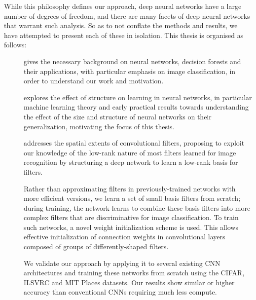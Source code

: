 \documentclass[thesis]{subfiles}
\begin{document}
While this philosophy defines our approach, deep neural networks have a large number of degrees of freedom, and there are many facets of deep neural networks that warrant such analysis. So as to not conflate the methods and results, we have attempted to present each of these in isolation. This thesis is organised as follows:
\begin{description}
	\item[] gives the necessary background on neural networks, decision forests and their applications, with particular emphasis on image classification, in order to understand our work and motivation.
	
	\item[] explores the effect of structure on learning in neural networks, in particular machine learning theory and early practical results towards understanding the effect of the size and structure of neural networks on their generalization, motivating the focus of this thesis.
	
	\item[] addresses the spatial extents of convolutional filters, proposing to exploit our knowledge of the low-rank nature of most filters learned for image recognition by structuring a deep network to learn a low-rank basis for filters.
	
	Rather than approximating filters in previously-trained networks with more efficient versions, we learn a set of small basis filters from scratch; during training, the network learns to combine these basis filters into more complex filters that are discriminative for image classification. To train such networks, a novel weight initialization scheme is used. This allows effective initialization of connection weights in convolutional layers composed of groups of differently-shaped filters. 
	
	We validate our approach by applying it to several existing CNN architectures and training these networks from scratch using the CIFAR, ILSVRC and MIT Places datasets. Our results show similar or higher accuracy than conventional CNNs requiring much less compute. %
	

\end{description}
\end{document}
